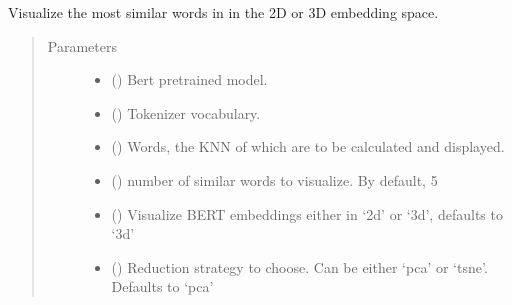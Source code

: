\documentclass[letterpaper,10pt,english]{sphinxmanual}
\begin{document}
\begin{fulllineitems}
\label{\detokenize{code:code_utils.plotter.plot_bert_embeddings_nn}}
Visualize the  most similar words in  in the 2D or 3D
embedding space.
\begin{quote}\begin{description}
\item[{Parameters}] \leavevmode\begin{itemize}
\item {} 
 () \textendash{} Bert pretrained model.

\item {} 
 () \textendash{} Tokenizer vocabulary.

\item {} 
 () \textendash{} Words, the KNN of which are to be calculated and
displayed.

\item {} 
 (\sphinxstyleliteralemphasis{\sphinxupquote{, }}) \textendash{} number of similar words to visualize. By default, 5

\item {} 
 (\sphinxstyleliteralemphasis{\sphinxupquote{, }}) \textendash{} Visualize BERT embeddings either in ‘2d’ or
‘3d’, defaults to ‘3d’

\item {} 
 (\sphinxstyleliteralemphasis{\sphinxupquote{, }}) \textendash{} Reduction strategy to choose. Can be either
‘pca’ or ‘tsne’. Defaults to ‘pca’


\end{itemize}
\end{description}
\end{quote}
\end{fulllineitems}
\end{document}
